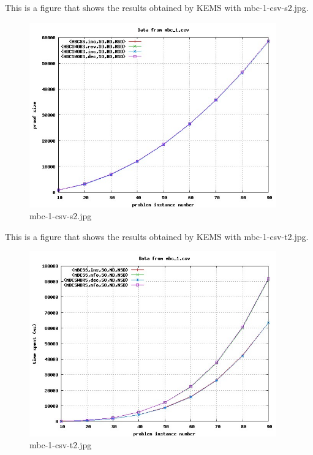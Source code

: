 This is a figure that shows the results obtained by KEMS with mbc-1-csv-s2.jpg.
\begin{figure}[htbp]
\begin{center}
\includegraphics[width=0.95\textwidth]{figuras/mbc-1-csv-s2.jpg}
\end{center}
\caption{mbc-1-csv-s2.jpg}
\end{figure}

This is a figure that shows the results obtained by KEMS with mbc-1-csv-t2.jpg.
\begin{figure}[htbp]
\begin{center}
\includegraphics[width=0.95\textwidth]{figuras/mbc-1-csv-t2.jpg}
\end{center}
\caption{mbc-1-csv-t2.jpg}
\end{figure}


